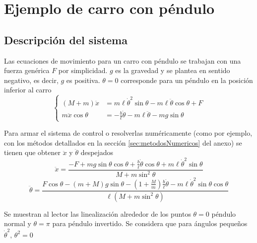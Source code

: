 \section{Ejemplo de carro con péndulo}
\subsection{Descripción del sistema}
Las ecuaciones de movimiento para un carro con péndulo se trabajan con una fuerza genérica $F$ por simplicidad. $g$ es la gravedad y se plantea en sentido negativo, es decir, $g$ es positiva. $\theta=0$ corresponde para un péndulo en la posición inferior al carro
\[
\begin{cases}
(M+m) \ddot{x} &=m \ell \dot{\theta}^{2} \sin \theta-m \ell \ddot{\theta}\cos \theta+F\\
 m \ddot{x} \cos \theta &= -\frac{b}{\ell} \dot{\theta} -m \ell \ddot{\theta} - m g \sin \theta
\end{cases}
\]


Para armar el sistema de control o resolverlas numéricamente (como por ejemplo, con los métodos detallados en la sección \ref{sec:metodosNumericos} del anexo) se tienen que obtener $\ddot{x}$ y $\ddot{\theta}$ despejados
\[
\ddot{x}=\frac{-F +m g \sin \theta \cos \theta+\frac{b}{\ell} \dot{\theta} \cos \theta + m \ell \dot{\theta}^2 \sin \theta}{M+m \sin ^{2} \theta}
\]
\[
\ddot{\theta}=\frac{F\cos \theta -(m+M) g \sin \theta-(1+\frac{M}{m})\frac{b}{\ell} \dot{\theta} - m \ell \dot{\theta}^{ 2} \sin \theta \cos \theta}{\ell\left(M+m \sin ^{2} \theta\right)}
\]

Se muestran al lector las linealización alrededor de los puntos $\theta = 0$ péndulo normal y $\theta = \pi$ para péndulo invertido. Se considera que para ángulos pequeños $\dot{\theta}^2,\,\theta^2 = 0$

